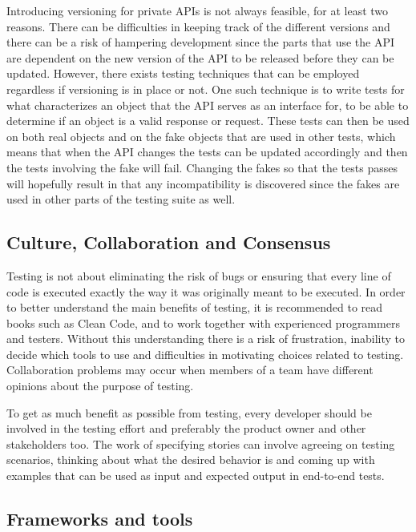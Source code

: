 \documentclass[11pt]{article}
\begin{document}
Introducing versioning for private APIs is not always feasible, for at least two reasons. There can be difficulties in keeping track of the different versions and there can be a risk of hampering development since the parts that use the API are dependent on the new version of the API to be released before they can be updated. However, there exists testing techniques that can be employed regardless if versioning is in place or not. One such technique is to write tests for what characterizes an object that the API serves as an interface for, to be able to determine if an object is a valid response or request. These tests can then be used on both real objects and on the fake objects that are used in other tests, which means that when the API changes the tests can be updated accordingly and then the tests involving the fake will fail. Changing the fakes so that the tests passes will hopefully result in that any incompatibility is discovered since the fakes are used in other parts of the testing suite as well. \cite[question~34]{Edelstam}

\subsection{Culture, Collaboration and Consensus}
\label{sec:ccc}

Testing is not about eliminating the risk of bugs or ensuring that every line of code is executed exactly the way it was originally meant to be executed. In order to better understand the main benefits of testing, it is recommended to read books such as Clean Code, and to work together with experienced programmers and testers. Without this understanding there is a risk of frustration, inability to decide which tools to use and difficulties in motivating choices related to testing. Collaboration problems may occur when members of a team have different opinions about the purpose of testing. \cite[question~38]{Edelstam}

To get as much benefit as possible from testing, every developer should be involved in the testing effort and preferably the product owner and other stakeholders too. The work of specifying stories can involve agreeing on testing scenarios, thinking about what the desired behavior is and coming up with examples that can be used as input and expected output in end-to-end tests. \cite[questions~39-40]{Edelstam}

\subsection{Frameworks and tools}
\end{document}
